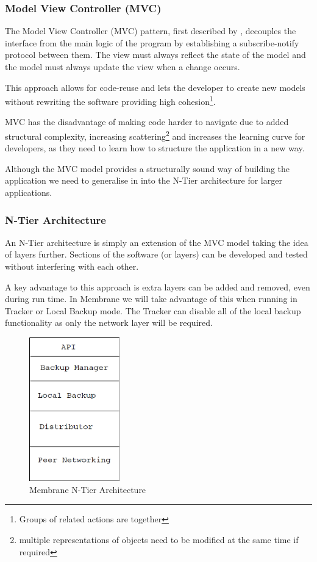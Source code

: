 \documentclass[11pt, a4paper, twoside]{report}
\begin{document}
\subsubsection{Model View Controller (MVC)}

The Model View Controller (MVC) pattern, first described by \cite{krasner1988cookbook}, decouples the interface from the main logic of the program by establishing a subscribe-notify protocol between them. The view must always reflect the state of the model and the model must always update the view when a change occurs.

This approach allows for code-reuse and lets the developer to create new models without rewriting the software providing high cohesion\footnote{Groups of related actions are together}.

MVC has the disadvantage of making code harder to navigate due to added structural complexity, increasing scattering\footnote{multiple representations of objects need to be modified at the same time if required} and increases the learning curve for developers, as they need to learn how to structure the application in a new way.

Although the MVC model provides a structurally sound way of building the application we need to generalise in into the N-Tier architecture for larger applications.

\subsubsection{N-Tier Architecture}

An N-Tier architecture is simply an extension of the MVC model taking the idea of layers further. Sections of the software (or layers) can be developed and tested without interfering with each other.

A key advantage to this approach is extra layers can be added and removed, even during run time. In Membrane we will take advantage of this when running in Tracker or Local Backup mode. The Tracker can disable all of the local backup functionality as only the network layer will be required.

\begin{figure}[b!]
 \centering
 \includegraphics[width=0.35\textwidth]{membrane-n-tier}
 \caption{Membrane N-Tier Architecture}
 \label{fig:membrane-n-tier}
\end{figure}
\end{document}
